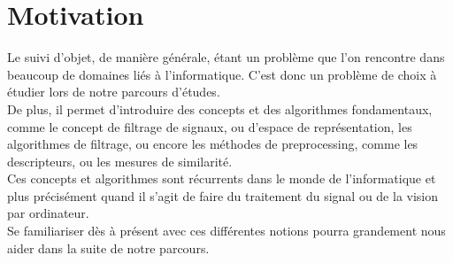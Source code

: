 \section{Motivation}
Le suivi d'objet, de manière générale, étant un problème que l'on rencontre dans beaucoup de domaines liés à l'informatique. C'est donc un problème de choix à étudier lors de notre parcours d'études.\\
De plus, il permet d'introduire des concepts et des algorithmes fondamentaux, comme le concept de filtrage de signaux, ou d'espace de représentation, les algorithmes de filtrage, ou encore les méthodes de preprocessing, comme les descripteurs, ou les mesures de similarité.\\
Ces concepts et algorithmes sont récurrents dans le monde de l'informatique et plus précisément quand il s'agit de faire du traitement du signal ou de la vision par ordinateur.\\
Se familiariser dès à présent avec ces différentes notions pourra grandement nous aider dans la suite de notre parcours.




